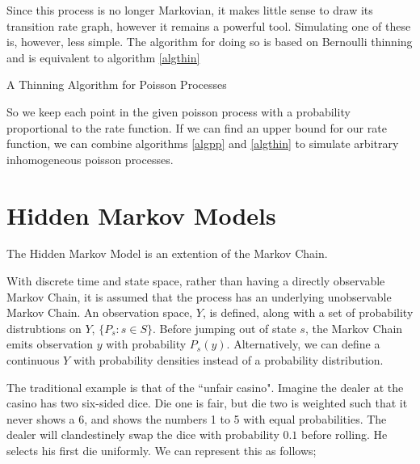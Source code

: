 Since this process is no longer Markovian, it makes little sense to draw its transition rate graph, however it remains a powerful tool. Simulating one of these is, however, less simple. The algorithm for doing so is based on Bernoulli thinning \cite{thinning} and is equivalent to algorithm \ref{algthin}

\begin{algorithm}
\SetAlgoLined
{}

\caption{A Thinning Algorithm for Poisson Processes}\label{algthin}

\end{algorithm}

So we keep each point in the given poisson process with a probability proportional to the rate function. If we can find an upper bound for our rate function, we can combine algorithms \ref{algpp} and \ref{algthin} to simulate arbitrary inhomogeneous poisson processes.

\section{Hidden Markov Models}

The Hidden Markov Model is an extention of the Markov Chain.

With discrete time and state space, rather than having a directly observable Markov Chain, it is assumed that the process has an underlying unobservable Markov Chain. An observation space, $Y$, is defined, along with a set of probability distrubtions on $Y$, $\{P_s : s \in S\}$. Before jumping out of state $s$, the Markov Chain emits observation $y$ with probability $P_s(y)$. Alternatively, we can define a continuous $Y$ with probability densities instead of a probability distribution.

The traditional example is that of the ``unfair casino". Imagine the dealer at the casino has two six-sided dice. Die one is fair, but die two is weighted such that it never shows a 6, and shows the numbers 1 to 5 with equal probabilities. The dealer will clandestinely swap the dice with probability $0.1$ before rolling. He selects his first die uniformly. We can represent this as follows;

